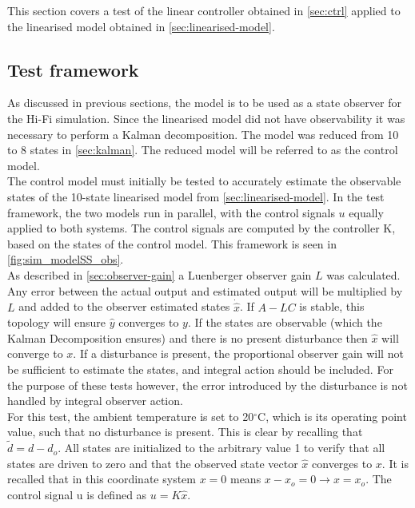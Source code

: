 This section covers a test of the linear controller obtained in \cref{sec:ctrl}
applied to the linearised model obtained in \cref{sec:linearised-model}.
\subsection{Test framework}
As discussed in previous sections, the model is to be used as a state observer for the Hi-Fi simulation. Since the linearised model did not have observability it was necessary to perform a Kalman decomposition. The model was reduced from 10 to 8 states in \cref{sec:kalman}. The reduced model will be referred to as the control model. \\

\noindent The control model must initially be tested to accurately estimate the observable states of the  10-state linearised model from \cref{sec:linearised-model}. In the test framework, the two models run in parallel, with the control signals $u$ equally applied to both systems. The control signals are computed by the controller K, based on the states of the control model. This framework is seen in \cref{fig:sim_modelSS_obs}. \\

\noindent As described in \cref{sec:observer-gain} a Luenberger observer gain $L$ was calculated. Any error between the actual output and estimated output will be multiplied by $L$ and added to the observer estimated states $\dot{\hat{x}}$. If $A-LC$ is stable, this topology will ensure $\hat{y}$ converges to $y$. If the states are observable (which the Kalman Decomposition ensures) and there is no present disturbance then $\hat{x}$ will converge to $x$. If a disturbance is present, the proportional observer gain will not be sufficient to estimate the states, and integral action should be included. For the purpose of these tests however, the error introduced by the disturbance is not handled by integral observer action. \\

\noindent For this test, the ambient temperature is set to 20$^{\circ}$C, which is its operating point value, such that no disturbance is present. This is clear by recalling that $\tilde{d} = d-d_o$. All states are initialized to the arbitrary value 1 to verify that all states are driven to zero and that the observed state vector $\hat{x}$ converges to $x$. It is recalled that in this coordinate system $x=0$ means $x-x_o = 0 \rightarrow x=x_o$. The control signal u is defined as $u=K\hat{x}$.



